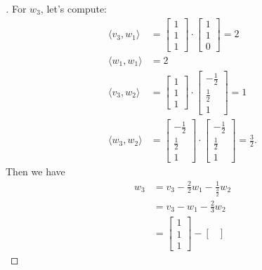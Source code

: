 \documentclass[11pt]{article}
\begin{document}
\begin{enumerate}
\begin{proof}[\unskip\nopunct]
            For \(w_3\), let's compute:
            \begin{align*}
                \langle v_3, w_1 \rangle &= \begin{bmatrix}
                    1 \\ 1 \\ 1
                \end{bmatrix} \cdot \begin{bmatrix}
                    1 \\ 1 \\ 0
                \end{bmatrix} = 2 \\
                \langle w_1, w_1 \rangle &= 2 \\
                \langle v_3, w_2 \rangle &= \begin{bmatrix}
                    1 \\ 1 \\ 1
                \end{bmatrix} \cdot \begin{bmatrix}
                    - \frac{1}{2} \\ \frac{1}{2} \\ 1
                \end{bmatrix} = 1 \\
                \langle w_3, w_2 \rangle &= \begin{bmatrix}
                    - \frac{1}{2} \\ \frac{1}{2} \\ 1
                \end{bmatrix} \cdot \begin{bmatrix}
                    -\frac{1}{2} \\ \frac{1}{2} \\ 1
                \end{bmatrix} = \frac{3}{2}.
            \end{align*}
            Then we have
            \begin{align*}
                w_3 &= v_3 - \frac{2}{2} w_1 - \frac{1}{\frac{3}{2}} w_2 \\
                    &= v_3 - w_1 - \frac{2}{3} w_2 \\
                    &= \begin{bmatrix}
                        1 \\ 1 \\ 1
                    \end{bmatrix} - \begin{bmatrix}

\end{bmatrix}
\end{align*}
\end{proof}
\end{enumerate}
\end{document}
